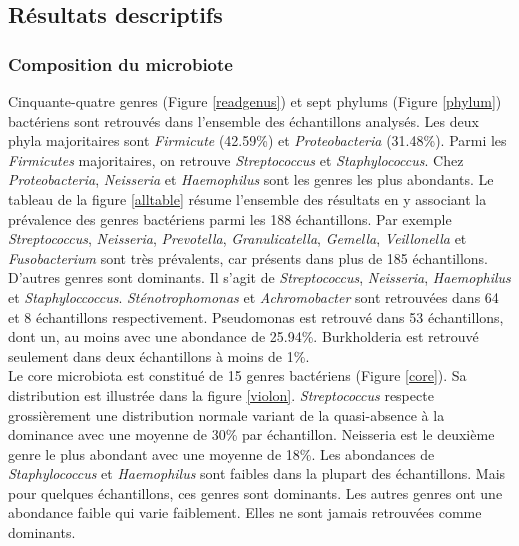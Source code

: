 \documentclass[12pt,a4paper]{article}
\begin{document}
\subsection{Résultats descriptifs}
\subsubsection{Composition du microbiote}
Cinquante-quatre genres (Figure \ref{readgenus}) et sept phylums (Figure \ref{phylum}) bactériens sont retrouvés dans l'ensemble des échantillons analysés.
Les deux phyla majoritaires sont \textit{Firmicute} (42.59\%) et \textit{Proteobacteria} (31.48\%). Parmi les \textit{Firmicutes} majoritaires, on retrouve \textit{Streptococcus} et \textit{Staphylococcus}. Chez \textit{Proteobacteria}, \textit{Neisseria} et \textit{Haemophilus} sont les genres les plus abondants.
Le tableau de la figure \ref{alltable} résume l'ensemble des résultats en y associant la prévalence des genres bactériens parmi les 188 échantillons.
Par exemple \textit{Streptococcus}, \textit{Neisseria}, \textit{Prevotella}, \textit{Granulicatella}, \textit{Gemella}, \textit{Veillonella} et \textit{Fusobacterium} sont très prévalents, car présents dans plus de 185 échantillons.
D’autres genres sont dominants. Il s’agit de \textit{Streptococcus}, \textit{Neisseria}, \textit{Haemophilus} et \textit{Staphyloccoccus}. \textit{Sténotrophomonas} et \textit{Achromobacter} sont retrouvées dans 64 et 8 échantillons respectivement. Pseudomonas est retrouvé dans 53 échantillons, dont un, au moins avec une abondance de 25.94\%. Burkholderia est retrouvé seulement dans deux échantillons à moins de 1\%.\\
Le core microbiota est constitué de 15 genres bactériens (Figure \ref{core}). Sa distribution est illustrée dans la figure \ref{violon}.
\textit{Streptococcus} respecte grossièrement une distribution normale variant de la quasi-absence à la dominance avec une moyenne de 30\% par échantillon. Neisseria est le deuxième genre le plus abondant avec une moyenne de 18\%.
Les abondances de \textit{Staphylococcus} et \textit{Haemophilus} sont faibles dans la plupart des échantillons. Mais pour quelques échantillons, ces genres sont dominants. Les autres genres ont une abondance faible qui varie faiblement. Elles ne sont jamais retrouvées comme dominants.
\end{document}
